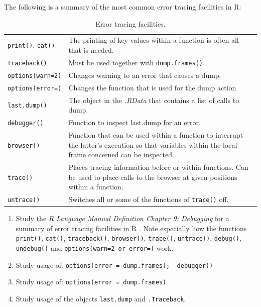\documentclass[
]{book}
\begin{document}
The following is a summary of the most common error tracing facilities in R:

\begin{longtable}[]{@{}
  >{\raggedright\arraybackslash}p{}
  >{\raggedright\arraybackslash}p{}@{}}
\caption{\label{tab:ErrorTracing} Error tracing facilities.}\tabularnewline
\toprule\noalign{}
\endfirsthead
\endhead
\bottomrule\noalign{}
\endlastfoot
\texttt{print()}, \texttt{cat()} & The printing of key values within a function is often all that is needed. \\
\texttt{traceback()} & Must be used together with \texttt{dump.frames()}. \\
\texttt{options(warn=2)} & Changes warning to an error that causes a dump. \\
\texttt{options(error=)} & Changes the function that is used for the dump action. \\
\texttt{last.dump()} & The object in the \emph{{.RData}} that contains a list of calls to dump. \\
\texttt{debugger()} & Function to inspect last.dump for an error. \\
\texttt{browser()} & Function that can be used within a function to interrupt the latter's execution so that variables within the local frame concerned can be inspected. \\
\texttt{trace()} & Places tracing information before or within functions. Can be used to place calls to the browser at given positions within a function. \\
\texttt{untrace()} & Switches all or some of the functions of \texttt{trace()} off. \\
\end{longtable}

\begin{enumerate}
\def\labelenumi{(\alph{enumi})}
\item
  Study the \emph{R Language Manual Definition Chapter 9: Debugging} for a summary of error tracing facilities in R . Note especially how the functions \texttt{print()}, \texttt{cat()}, \texttt{traceback()}, \texttt{browser()}, \texttt{trace()}, \texttt{untrace()}, \texttt{debug()}, \texttt{undebug()} and \texttt{options(warn=2\ or\ error=)} work.
\item
  Study usage of: \texttt{options(error\ =\ dump.frames);\ \ debugger()}
\item
  Study usage of: \texttt{options(error\ =\ dump.frames)}
\item
  Study usage of the objects \texttt{last.dump} and \texttt{.Traceback}.
\end{enumerate}
\end{document}
